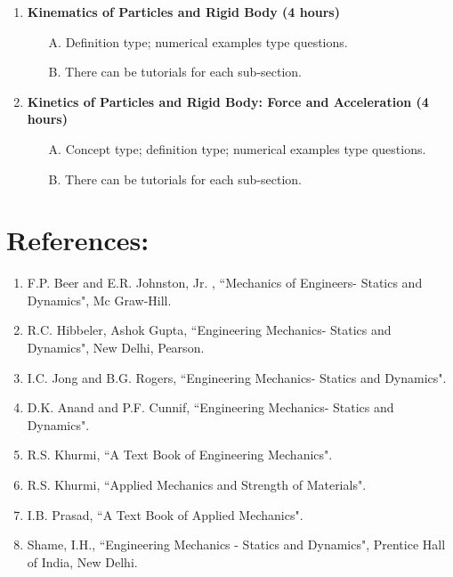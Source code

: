 \begin{enumerate}
    \item \textbf{Kinematics of Particles and Rigid Body \hfill (4 hours)}
      \begin{itemize}
       \item[A.] Definition type; numerical examples type questions.
       \item[B.] There can be tutorials for each sub-section.
    \end{itemize}
    
    \item \textbf{Kinetics of Particles and Rigid Body: Force and Acceleration \hfill (4 hours)}
      \begin{itemize}
       \item[A.] Concept type; definition type; numerical examples type questions.
       \item[B.] There can be tutorials for each sub-section.
    \end{itemize}
\end{enumerate}


\section*{References:}
\begin{enumerate}
    \item F.P. Beer and E.R. Johnston, Jr. , ``Mechanics of Engineers- Statics and Dynamics", Mc Graw-Hill.
    
    \item R.C. Hibbeler, Ashok Gupta, ``Engineering Mechanics- Statics and Dynamics", New Delhi, Pearson.
    
    \item I.C. Jong and B.G. Rogers, ``Engineering Mechanics- Statics and Dynamics".
    
    \item D.K. Anand and P.F. Cunnif, ``Engineering Mechanics- Statics and Dynamics".
    
    \item R.S. Khurmi, ``A Text Book of Engineering Mechanics".
    
    \item R.S. Khurmi, ``Applied Mechanics and Strength of Materials".
    
    \item I.B. Prasad, ``A Text Book of Applied Mechanics".
    
    \item Shame, I.H., ``Engineering Mechanics - Statics and Dynamics", Prentice Hall of India, New Delhi.
\end{enumerate}
